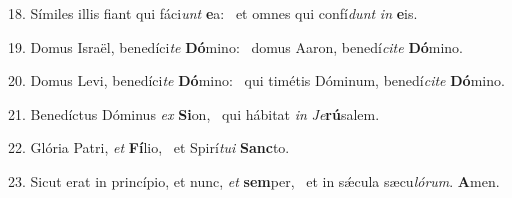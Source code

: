 18. Símiles illis fiant qui fáci\textit{unt} \textbf{e}a: \ast\  et omnes qui confí\textit{dunt} \textit{in} \textbf{e}is.\

19. Domus Israël, benedíci\textit{te} \textbf{Dó}mino: \ast\  domus Aaron, benedí\textit{ci}\textit{te} \textbf{Dó}mino.\

20. Domus Levi, benedíci\textit{te} \textbf{Dó}mino: \ast\  qui timétis Dóminum, benedí\textit{ci}\textit{te} \textbf{Dó}mino.\

21. Benedíctus Dóminus \textit{ex} \textbf{Si}on, \ast\  qui hábitat \textit{in} \textit{Je}\textbf{rú}salem.\

22. Glória Patri, \textit{et} \textbf{Fí}lio, \ast\  et Spirí\textit{tu}\textit{i} \textbf{Sanc}to.\

23. Sicut erat in princípio, et nunc, \textit{et} \textbf{sem}per, \ast\  et in sǽcula sæcu\textit{ló}\textit{rum}. \textbf{A}men.\

